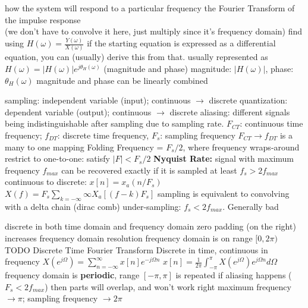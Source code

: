 \documentclass[12pt]{article}
\begin{document}
\begin{multicols*}{2}
\begin{flushleft}
\begin{outline}[longenum]
  \1 how the system will respond to a particular frequency
  \1 the Fourier Transform of the impulse response
    \\ (we don't have to convolve it here, just multiply since it's frequency domain)
  \1 find using $H(\omega)=\frac{Y(\omega)}{X(\omega)}$
    \2 if the starting equation is expressed as a differential equation, you can (usually) derive this from that.
  \1 usually represented as $H(\omega)=|H(\omega)|e^{j\theta_H(\omega)}$ (magnitude and phase)
    \2 magnitude: $|H(\omega)|$, phase: $\theta_H(\omega)$
  \1 magnitude and phase can be linearly combined

  \1 sampling: independent variable (input); continuous $\rightarrow$ discrete
  \1 quantization: dependent variable (output); continuous $\rightarrow$ discrete
  \1 aliasing: different signals being indistinguishable after sampling due to sampling rate.
  \1 $F_{CT}$: continuous time frequency; $f_{DT}$: discrete time frequency, $F_s$: sampling frequency 
  \1 $F_{CT} \rightarrow f_{DT}$ is a many to one mapping
    \2 Folding Frequency = $F_s/2$, where frequency wraps-around
    \2 restrict to one-to-one: satisfy $|F| < F_s / 2$
  \1 \textbf{Nyquist Rate:} signal with maximum frequency $f_{max}$ can be recovered exactly if it is sampled at least $f_s > 2f_{max}$
  \1 continuous to discrete:
    \2 $x[n] = x_a(n/F_s)$
    \2 $X(f) = F_s \sum_{k=-\infty}{\infty} X_a[(f-k)F_s]$
  \1 sampling is equivalent to convolving with a delta chain (dirac comb) %
  \1 under-sampling: $f_s<2 f_{max}$. Generally bad


  \1 discrete in both time domain and frequency domain
  \1 zero padding (on the right) increases frequency domain resolution
  \1 frequency domain is on range $[0, 2\pi)$
  \1 TODO
  \1 Discrete Time Fourier Transform
  \1 Discrete in time, continuous in frequency
  \1 $X(e^{j\Omega}) = \sum_{n=-\infty}^{\infty} x[n] e^{-j\Omega n}$
  \1 $x[n] = \frac{1}{2\pi} \int_{-\pi}^{\pi} X(e^{j\Omega}) e^{j\Omega n} d\Omega$
  \1 frequency domain is \textbf{periodic}, range $[-\pi,\pi]$ is repeated
    \2 if aliasing happens ($F_s < 2 f_{max}$) then parts will overlap, and won't work right
  \1 maximum frequency $\rightarrow \pi$; sampling frequency $\rightarrow 2\pi$



\end{outline}
\end{flushleft}
\end{multicols*}
\end{document}
